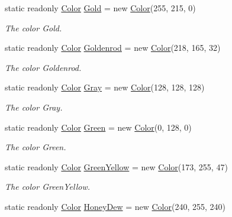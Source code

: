 \begin{DoxyCompactItemize}
static readonly \hyperlink{struct_tri_devs_1_1_tri_engine2_d_1_1_color}{Color} \hyperlink{struct_tri_devs_1_1_tri_engine2_d_1_1_color_adc33680b407689a2d494b89efa3e5c39}{Gold} = new \hyperlink{struct_tri_devs_1_1_tri_engine2_d_1_1_color}{Color}(255, 215, 0)
\begin{DoxyCompactList}\small\item\em The color Gold. \end{DoxyCompactList}\item 
static readonly \hyperlink{struct_tri_devs_1_1_tri_engine2_d_1_1_color}{Color} \hyperlink{struct_tri_devs_1_1_tri_engine2_d_1_1_color_aeecb848623d827652e9f90eddf78b04f}{Goldenrod} = new \hyperlink{struct_tri_devs_1_1_tri_engine2_d_1_1_color}{Color}(218, 165, 32)
\begin{DoxyCompactList}\small\item\em The color Goldenrod. \end{DoxyCompactList}\item 
static readonly \hyperlink{struct_tri_devs_1_1_tri_engine2_d_1_1_color}{Color} \hyperlink{struct_tri_devs_1_1_tri_engine2_d_1_1_color_a7ce9fe8d3f23c15a81e380b76daa0b7e}{Gray} = new \hyperlink{struct_tri_devs_1_1_tri_engine2_d_1_1_color}{Color}(128, 128, 128)
\begin{DoxyCompactList}\small\item\em The color Gray. \end{DoxyCompactList}\item 
static readonly \hyperlink{struct_tri_devs_1_1_tri_engine2_d_1_1_color}{Color} \hyperlink{struct_tri_devs_1_1_tri_engine2_d_1_1_color_a375f93a8f2cd6be6012f4ee49a1dcd70}{Green} = new \hyperlink{struct_tri_devs_1_1_tri_engine2_d_1_1_color}{Color}(0, 128, 0)
\begin{DoxyCompactList}\small\item\em The color Green. \end{DoxyCompactList}\item 
static readonly \hyperlink{struct_tri_devs_1_1_tri_engine2_d_1_1_color}{Color} \hyperlink{struct_tri_devs_1_1_tri_engine2_d_1_1_color_af6b5c3a3309073b141146c8c57411915}{Green\-Yellow} = new \hyperlink{struct_tri_devs_1_1_tri_engine2_d_1_1_color}{Color}(173, 255, 47)
\begin{DoxyCompactList}\small\item\em The color Green\-Yellow. \end{DoxyCompactList}\item 
static readonly \hyperlink{struct_tri_devs_1_1_tri_engine2_d_1_1_color}{Color} \hyperlink{struct_tri_devs_1_1_tri_engine2_d_1_1_color_abfafdfb7a773ae3b11dc691b72e576b1}{Honey\-Dew} = new \hyperlink{struct_tri_devs_1_1_tri_engine2_d_1_1_color}{Color}(240, 255, 240)

\end{DoxyCompactItemize}
